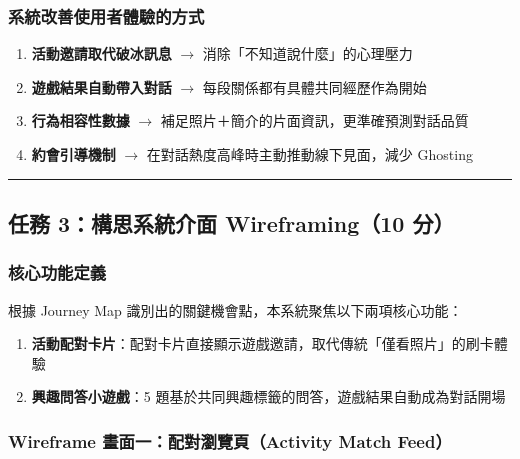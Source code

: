 \documentclass[12pt, a4paper]{article}
\begin{document}
\subsubsection*{系統改善使用者體驗的方式}

\begin{enumerate}[leftmargin=2em]
  \item \textbf{活動邀請取代破冰訊息} $\to$ 消除「不知道說什麼」的心理壓力
  \item \textbf{遊戲結果自動帶入對話} $\to$ 每段關係都有具體共同經歷作為開始
  \item \textbf{行為相容性數據} $\to$ 補足照片＋簡介的片面資訊，更準確預測對話品質
  \item \textbf{約會引導機制} $\to$ 在對話熱度高峰時主動推動線下見面，減少 Ghosting
\end{enumerate}

\bigskip
\hrule
\bigskip

\subsection*{任務 3：構思系統介面 Wireframing（10 分）}

\subsubsection*{核心功能定義}

根據 Journey Map 識別出的關鍵機會點，本系統聚焦以下兩項核心功能：

\begin{enumerate}[leftmargin=2em]
  \item \textbf{活動配對卡片}：配對卡片直接顯示遊戲邀請，取代傳統「僅看照片」的刷卡體驗
  \item \textbf{興趣問答小遊戲}：5 題基於共同興趣標籤的問答，遊戲結果自動成為對話開場
\end{enumerate}

\subsubsection*{Wireframe 畫面一：配對瀏覽頁（Activity Match Feed）}
\end{document}
